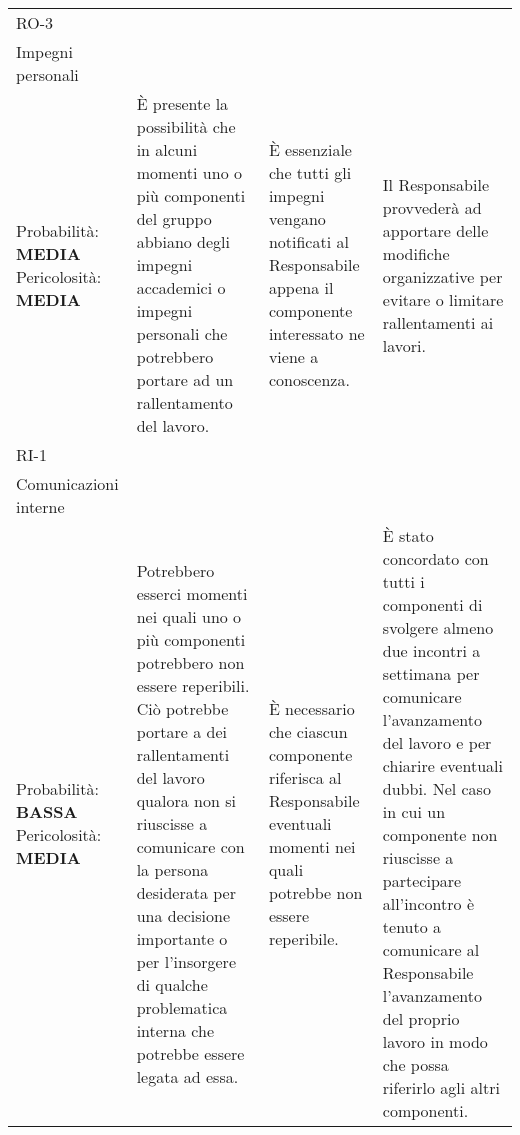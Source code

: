 \begin{longtable}{
		>{\centering}p{}
		>{\centering}p{}
		>{\centering}p{}
		>{\centering\arraybackslash}p{} }
	\rowcolor{lightRowColor}
	RO-3 \\ Impegni personali \\
		\vspace{5mm} %
		Probabilità: \textbf{MEDIA} Pericolosità: \textbf{MEDIA} &
		È presente la possibilità che in alcuni momenti uno o più componenti del gruppo abbiano degli impegni accademici o impegni personali che potrebbero portare ad un rallentamento del lavoro.
		&
		È essenziale che tutti gli impegni vengano notificati al Responsabile appena il componente interessato ne viene a conoscenza.
		&
		Il Responsabile provvederà ad apportare delle modifiche organizzative per evitare o limitare rallentamenti ai lavori. \\

	\rowcolor{darkRowColor}
	RI-1 \\ Comunicazioni interne \\
		\vspace{5mm} %
		Probabilità: \textbf{BASSA} Pericolosità: \textbf{MEDIA} &
		Potrebbero esserci momenti nei quali uno o più componenti potrebbero non essere reperibili. Ciò potrebbe portare a dei rallentamenti del lavoro qualora non si riuscisse a comunicare con la persona desiderata per una decisione importante o per l'insorgere di qualche problematica interna che potrebbe essere legata ad essa.
		&
		È necessario che ciascun componente riferisca al Responsabile eventuali momenti nei quali potrebbe non essere reperibile.
		&
		È stato concordato con tutti i componenti di svolgere almeno due incontri a settimana per comunicare l'avanzamento del lavoro e per chiarire eventuali dubbi. Nel caso in cui un componente non riuscisse a partecipare all'incontro è tenuto a comunicare al Responsabile l'avanzamento del proprio lavoro in modo che possa riferirlo agli altri componenti. \\


\end{longtable}
